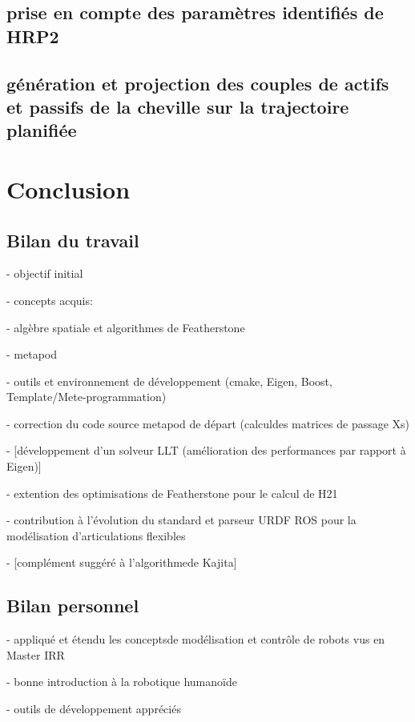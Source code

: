 \documentclass{report}
\begin{document}
\section{prise en compte des paramètres identifiés de HRP2}

\section{génération et projection des couples de actifs et passifs de la cheville sur la trajectoire planifiée}


\chapter*{Conclusion}
%

\section*{Bilan du travail}

- objectif initial

- concepts acquis:

	- algèbre spatiale et algorithmes de Featherstone
	
	- metapod
	
	- outils et environnement de développement (cmake, Eigen, Boost, Template/Mete-programmation)

- correction du code source metapod de départ (calculdes matrices de passage Xs)

- [développement d'un solveur LLT (amélioration des performances par rapport à Eigen)]

- extention des optimisations de Featherstone pour le calcul de H21

- contribution à l'évolution du standard et parseur URDF ROS pour la modélisation d'articulations flexibles

- [complément suggéré à l'algorithmede Kajita]


\section*{Bilan personnel}

- appliqué et étendu les conceptsde modélisation et contrôle de robots vus en Master IRR

- bonne introduction à la robotique humanoïde

- outils de développement appréciés
\end{document}
